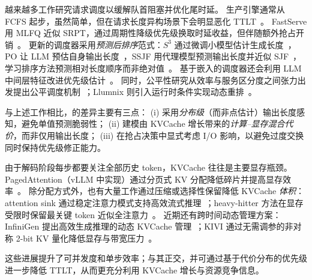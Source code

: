 越来越多工作研究请求调度以缓解队首阻塞并优化尾时延。
生产引擎通常从 FCFS 起步，虽然简单，但在请求长度异构场景下会明显恶化 TTLT~\cite{kwon2023efficient,zheng2024sglang}。
FastServe 用 MLFQ 近似 SRPT，通过周期性降级优先级换取时延收益，但伴随额外抢占开销~\cite{wu2023fast}。
更新的调度器采用\emph{预测后排序}范式：$S^3$ 通过微调小模型估计生成长度~\cite{jin2023s}，PO 让 LLM 预估自身输出长度~\cite{po}，SSJF 用代理模型预测输出长度并近似 SJF~\cite{qiu2024efficient}，学习排序方法预测相对长度顺序而非绝对值~\cite{fu2024efficient}。
基于嵌入的调度器还会利用 LLM 中间层特征改进优先级估计~\cite{shahout2024don}。
同时，公平性研究从效率与服务区分度之间张力出发提出公平调度机制~\cite{sheng2024fairness}；Llumnix 则引入运行时条件实现动态重排~\cite{sun2024llumnix}。

与上述工作相比，\oursched 的差异主要有三点：
(i) 采用\emph{分布级}（而非点估计）输出长度感知，避免单值预测脆弱性；
(ii) 建模由 KVCache 增长带来的\emph{计算--显存混合代价}，而非仅用输出长度；
(iii) 在抢占决策中显式考虑 I/O 影响，以避免过度交换同时保持优先级修正能力。

由于解码阶段每步都要关注全部历史 token，KVCache 往往是主要显存瓶颈。
PagedAttention（vLLM 中实现）通过分页式 KV 分配降低碎片并提高显存效率~\cite{kwon2023efficient}。
除分配方式外，也有大量工作通过压缩或选择性保留降低 KVCache \emph{体积}：attention sink 通过稳定注意力模式支持高效流式推理~\cite{xiao2023efficient}；heavy-hitter 方法在显存受限时保留最关键 token 近似全注意力~\cite{zhang2023h2o}。
近期还有跨时间动态管理方案：InfiniGen 提出高效生成推理的动态 KVCache 管理~\cite{lee2024infinigen}；KIVI 通过无需调参的非对称 2-bit KV 量化降低显存与带宽压力~\cite{liu2024kivi}。

这些进展提升了可并发度和单步效率；\oursched 与其正交，并可通过基于代价分布的优先级进一步降低 TTLT，从而更充分利用 KVCache 增长与资源竞争信息。

